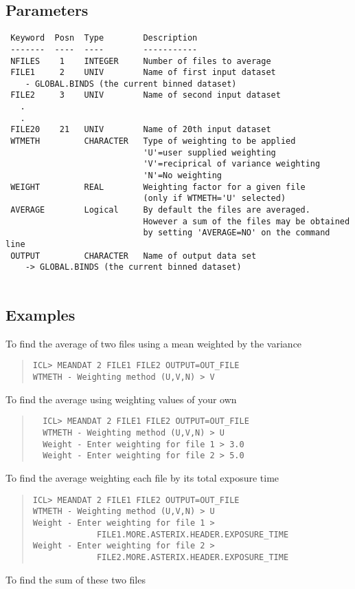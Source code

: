 \documentclass{book}
\renewcommand{\_}{{\tt\char'137}}     %
\begin{document}
\subsection{Parameters}
\begin{verbatim}
 Keyword  Posn  Type        Description
 -------  ----  ----        -----------
 NFILES    1    INTEGER     Number of files to average
 FILE1     2    UNIV        Name of first input dataset
    - GLOBAL.BINDS (the current binned dataset)
 FILE2     3    UNIV        Name of second input dataset
   .
   .
 FILE20    21   UNIV        Name of 20th input dataset
 WTMETH         CHARACTER   Type of weighting to be applied
                            'U'=user supplied weighting
                            'V'=reciprical of variance weighting
                            'N'=No weighting
 WEIGHT         REAL        Weighting factor for a given file
                            (only if WTMETH='U' selected)
 AVERAGE        Logical     By default the files are averaged.
                            However a sum of the files may be obtained
                            by setting 'AVERAGE=NO' on the command line
 OUTPUT         CHARACTER   Name of output data set
    -> GLOBAL.BINDS (the current binned dataset)
 
\end{verbatim}\subsection{Examples}
To find the average of two files using a mean weighted by the variance
 
\begin{quote}\begin{verbatim}
ICL> MEANDAT 2 FILE1 FILE2 OUTPUT=OUT_FILE
WTMETH - Weighting method (U,V,N) > V
\end{verbatim}\end{quote}
To find the average using weighting values of your own
 
\begin{quote}\begin{verbatim}
  ICL> MEANDAT 2 FILE1 FILE2 OUTPUT=OUT_FILE
  WTMETH - Weighting method (U,V,N) > U
  Weight - Enter weighting for file 1 > 3.0
  Weight - Enter weighting for file 2 > 5.0
\end{verbatim}\end{quote}
To find the average weighting each file by its total exposure time
\begin{quote}\begin{verbatim}
ICL> MEANDAT 2 FILE1 FILE2 OUTPUT=OUT_FILE
WTMETH - Weighting method (U,V,N) > U
Weight - Enter weighting for file 1 >
             FILE1.MORE.ASTERIX.HEADER.EXPOSURE_TIME
Weight - Enter weighting for file 2 >
             FILE2.MORE.ASTERIX.HEADER.EXPOSURE_TIME
\end{verbatim}\end{quote}
To find the sum of these two files
 
\end{document}
